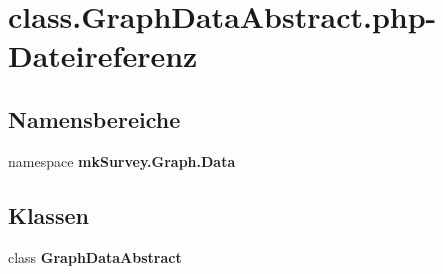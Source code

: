 \section{class.GraphDataAbstract.php-Dateireferenz}
\label{class_8GraphDataAbstract_8php}
\subsection*{Namensbereiche}
\begin{CompactItemize}
\item 
namespace {\bf mkSurvey.Graph.Data}
\end{CompactItemize}
\subsection*{Klassen}
\begin{CompactItemize}
\item 
class {\bf GraphDataAbstract}
\end{CompactItemize}
